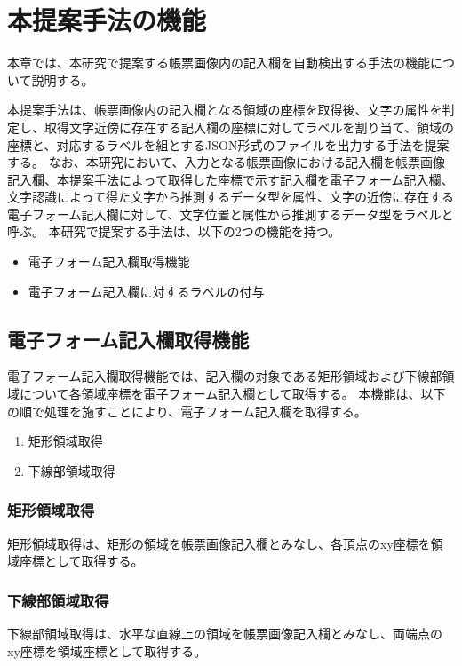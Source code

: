 \chapter{本提案手法の機能}\label{cha:Function}
本章では、本研究で提案する帳票画像内の記入欄を自動検出する手法の機能について説明する。

本提案手法は、帳票画像内の記入欄となる領域の座標を取得後、文字の属性を判定し、取得文字近傍に存在する記入欄の座標に対してラベルを割り当て、領域の座標と、対応するラベルを組とするJSON形式のファイルを出力する手法を提案する。
なお、本研究において、入力となる帳票画像における記入欄を帳票画像記入欄、本提案手法によって取得した座標で示す記入欄を電子フォーム記入欄、文字認識によって得た文字から推測するデータ型を属性、文字の近傍に存在する電子フォーム記入欄に対して、文字位置と属性から推測するデータ型をラベルと呼ぶ。
本研究で提案する手法は、以下の2つの機能を持つ。

\begin{itemize}
  \item 電子フォーム記入欄取得機能
  \item 電子フォーム記入欄に対するラベルの付与
\end{itemize}


\section{電子フォーム記入欄取得機能}\label{sec:eform_write_space_obtainment_feature}
電子フォーム記入欄取得機能では、記入欄の対象である矩形領域および下線部領域について各領域座標を電子フォーム記入欄として取得する。
本機能は、以下の順で処理を施すことにより、電子フォーム記入欄を取得する。

\begin{enumerate}
  \item 矩形領域取得
  \item 下線部領域取得
\end{enumerate}

\subsection{矩形領域取得}\label{subsec:rect_coords_obtainment}
矩形領域取得は、矩形の領域を帳票画像記入欄とみなし、各頂点のxy座標を領域座標として取得する。

\subsection{下線部領域取得}\label{subsec:underline_coords_obtainment}
下線部領域取得は、水平な直線上の領域を帳票画像記入欄とみなし、両端点のxy座標を領域座標として取得する。


